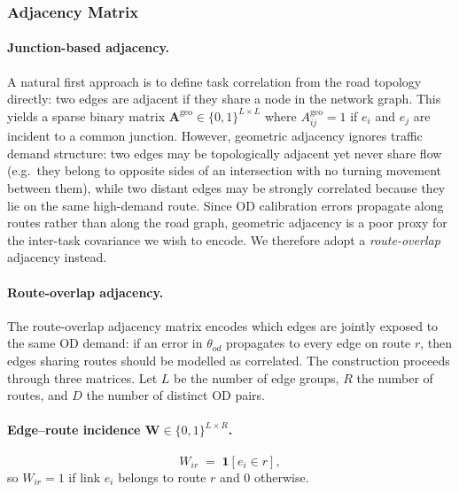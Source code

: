 \documentclass[11pt]{article}
\begin{document}

\subsubsection{Adjacency Matrix}
\label{subsec:adjacency-route}

\paragraph{Junction-based adjacency.}
A natural first approach is to define task correlation from the road topology
directly: two edges are adjacent if they share a node in the network graph.
This yields a sparse binary matrix $\mathbf{A}^{\mathrm{geo}} \in \{0,1\}^{L \times L}$
where $A^{\mathrm{geo}}_{ij} = 1$ if $e_i$ and $e_j$ are incident to a common
junction. However, geometric adjacency ignores traffic demand structure: two
edges may be topologically adjacent yet never share flow (e.g.\ they belong to
opposite sides of an intersection with no turning movement between them),
while two distant edges may be strongly correlated because they lie on the same
high-demand route. Since OD calibration errors propagate along routes rather
than along the road graph, geometric adjacency is a poor proxy for the
inter-task covariance we wish to encode. We therefore adopt a
\emph{route-overlap} adjacency instead.

\paragraph{Route-overlap adjacency.}
The route-overlap adjacency matrix encodes which edges are jointly exposed to
the same OD demand: if an error in $\theta_{od}$ propagates to every edge on
route $r$, then edges sharing routes should be modelled as correlated.
The construction proceeds through three matrices.
Let $L$ be the number of edge groups, $R$ the number of routes, and $D$ the
number of distinct OD pairs.

\paragraph{Edge--route incidence $\mathbf{W} \in \{0,1\}^{L \times R}$.}
\begin{equation}
    W_{ir} \;=\; \mathbf{1}[e_i \in r],
    \label{eq:W-binary}
\end{equation}
so $W_{ir}=1$ if link $e_i$ belongs to route $r$ and $0$ otherwise.
\end{document}
